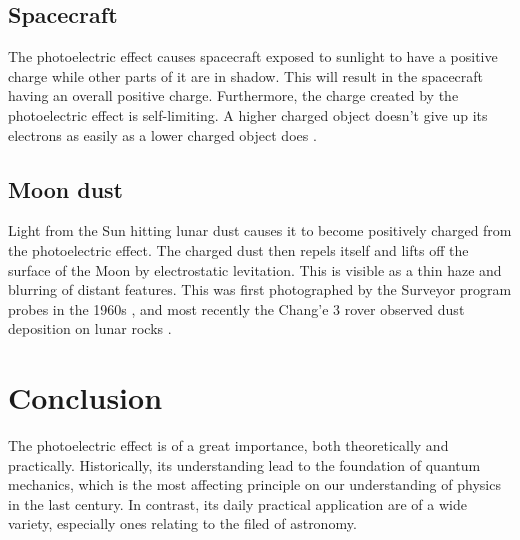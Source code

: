 \documentclass[stu, a4paper, 12pt, floatsintext]{apa7}
\begin{document}
\subsection{Spacecraft}

The photoelectric effect causes spacecraft exposed to sunlight to have a
positive charge while other parts of it are in shadow. This will result in the
spacecraft having an overall positive charge. Furthermore, the charge created by the
photoelectric effect is self-limiting. A higher charged object doesn't give up
its electrons as easily as a lower charged object does \parencite{craft}.

\subsection{Moon dust}

Light from the Sun hitting lunar dust causes it to become positively charged
from the photoelectric effect. The charged dust then repels itself and lifts off
the surface of the Moon by electrostatic levitation. This is visible as a thin
haze and blurring of distant features. This was first photographed by the
Surveyor program probes in the 1960s \parencite{lunar}, and most recently the
Chang'e 3 rover observed dust deposition on lunar rocks \parencite{fountain}.

\section{Conclusion}

The photoelectric effect is of a great importance, both theoretically and
practically. Historically, its understanding lead to the foundation of quantum
mechanics, which is the most affecting principle on our understanding of
physics in the last century. In contrast, its daily practical application are of
a wide variety, especially ones relating to the filed of astronomy.

\printbibliography
\end{document}
